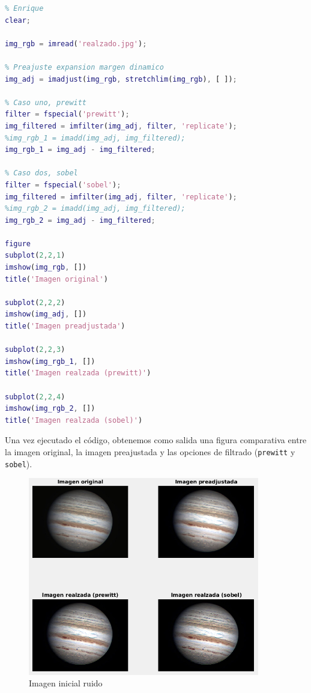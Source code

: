 \documentclass[12pt]{article}
\begin{document}
	\begin{lstlisting}[language=Matlab, caption={Implementación de filtros para el realzado en MATLAB}]
% 5 - Realzado
% Enrique
clear;

img_rgb = imread('realzado.jpg');

% Preajuste expansion margen dinamico
img_adj = imadjust(img_rgb, stretchlim(img_rgb), [ ]);

% Caso uno, prewitt
filter = fspecial('prewitt');
img_filtered = imfilter(img_adj, filter, 'replicate');
%img_rgb_1 = imadd(img_adj, img_filtered);
img_rgb_1 = img_adj - img_filtered;

% Caso dos, sobel
filter = fspecial('sobel');
img_filtered = imfilter(img_adj, filter, 'replicate');
%img_rgb_2 = imadd(img_adj, img_filtered);
img_rgb_2 = img_adj - img_filtered;

figure
subplot(2,2,1)
imshow(img_rgb, [])
title('Imagen original')

subplot(2,2,2)
imshow(img_adj, [])
title('Imagen preadjustada')

subplot(2,2,3)
imshow(img_rgb_1, [])
title('Imagen realzada (prewitt)')

subplot(2,2,4)
imshow(img_rgb_2, [])
title('Imagen realzada (sobel)')

	\end{lstlisting}

	\pagebreak
	
	\noindent Una vez ejecutado el código, obtenemos como salida una figura comparativa entre la imagen original, la imagen preajustada y las opciones de filtrado (\texttt{prewitt} y \texttt{sobel}).
	
	\begin{figure}[h]
		\begin{center}
			\includegraphics[width=0.9\textwidth]{img/realzado_output.png}
			\caption{Imagen inicial ruido}
			\label{img: realzado output}
		\end{center}
	\end{figure}
\end{document}
